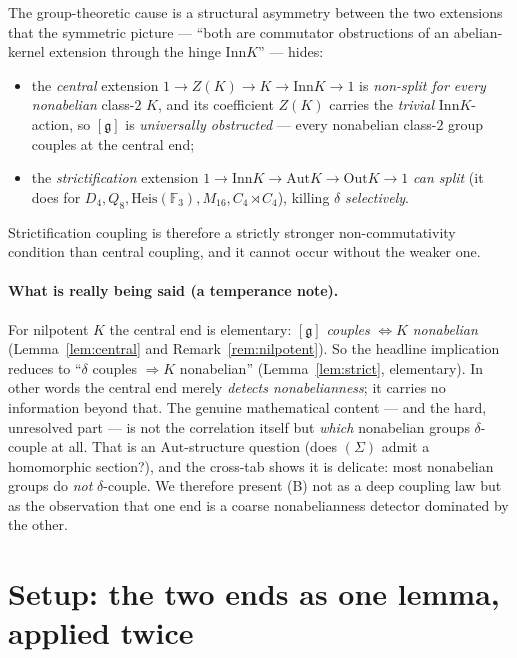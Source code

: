 \documentclass[11pt]{article}
\theoremstyle{definition}
\newcommand{\F}{\mathbb{F}}
\newcommand{\Aut}{\mathrm{Aut}}
\newcommand{\Inn}{\mathrm{Inn}}
\newcommand{\Out}{\mathrm{Out}}
\newcommand{\gerbe}{\mathfrak{g}}
\newcommand{\Heis}{\mathrm{Heis}}
\begin{document}
The group-theoretic cause is a structural asymmetry between the two extensions that the
symmetric picture --- ``both are commutator obstructions of an abelian-kernel extension through
the hinge $\Inn K$'' --- hides:
\begin{itemize}
\item the \emph{central} extension $1\to Z(K)\to K\to\Inn K\to1$ is \emph{non-split for every
nonabelian} class-$2$ $K$, and its coefficient $Z(K)$ carries the \emph{trivial}
$\Inn K$-action, so $[\gerbe]$ is \emph{universally obstructed} --- every nonabelian class-$2$
group couples at the central end;
\item the \emph{strictification} extension
$1\to\Inn K\to\Aut K\to\Out K\to1$ \emph{can split} (it does for
$D_4,Q_8,\Heis(\F_3),M_{16},C_4\rtimes C_4$), killing $\delta$ \emph{selectively}.
\end{itemize}
Strictification coupling is therefore a strictly stronger non-commutativity condition than
central coupling, and it cannot occur without the weaker one.

\paragraph{What is really being said (a temperance note).} For nilpotent $K$ the central end is
elementary: $[\gerbe]$ \emph{couples} $\iff K$ \emph{nonabelian} (Lemma~\ref{lem:central} and
Remark~\ref{rem:nilpotent}). So the headline implication reduces to
``$\delta$ couples $\Rightarrow K$ nonabelian'' (Lemma~\ref{lem:strict}, elementary). In other
words the central end merely \emph{detects nonabelianness}; it carries no information beyond
that. The genuine mathematical content --- and the hard, unresolved part --- is not the
correlation itself but \emph{which} nonabelian groups $\delta$-couple at all. That is an
$\Aut$-structure question (does $(\Sigma)$ admit a homomorphic section?), and the cross-tab shows
it is delicate: most nonabelian groups do \emph{not} $\delta$-couple. We therefore present (B)
not as a deep coupling law but as the observation that one end is a coarse nonabelianness
detector dominated by the other.

\section{Setup: the two ends as one lemma, applied twice}\label{sec:setup}
\end{document}
